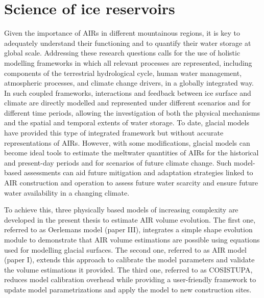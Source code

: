 \chapter{Science of ice reservoirs}
\label{chap:science}


Given the importance of \ac{AIRs} in different mountainous regions, it is key to adequately understand their
functioning and to quantify their water storage at global scale. Addressing these research questions calls for
the use of holistic modelling frameworks in which all relevant processes are represented, including components
of the terrestrial hydrological cycle, human water management, atmospheric processes, and climate change
drivers, in a globally integrated way. In such coupled frameworks, interactions and feedback between ice surface
and climate are directly modelled and represented under different scenarios and for different time periods,
allowing the investigation of both the physical mechanisms and the spatial and temporal extents of water
storage. To date, glacial models have provided this type of integrated framework but without accurate
representations of \ac{AIRs}. However, with some modifications, glacial models can become ideal tools to
estimate the meltwater quantities of \ac{AIRs} for the historical and present-day periods and for scenarios of
future climate change. Such model-based assessments can aid future mitigation and adaptation strategies linked
to \ac{AIR} construction and operation to assess future water scarcity and ensure future water availability in a
changing climate.

To achieve this, three physically based models of increasing complexity are developed in the present thesis to
estimate AIR volume evolution. The first one, referred to as Oerlemans model (paper III), integrates a simple
shape evolution module to demonstrate that \ac{AIR} volume estimations are possible using equations used for
modelling glacial surfaces. The second one, referred to as \ac{AIR} model (paper I), extends this approach to
calibrate the model parameters and validate the volume estimations it provided. The third one, referred to as
COSISTUPA, reduces model calibration overhead while providing a user-friendly framework to update model
parametrizations and apply the model to new construction sites. 

